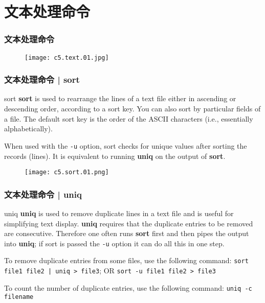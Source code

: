 \section{文本处理命令}
\begin{frame}
  \frametitle{\alert{文本处理命令}}
  \begin{figure}
    \centering
    \texttt{[image: c5.text.01.jpg]}
  \end{figure}
\end{frame}

\begin{frame}[fragile]
  \frametitle{文本处理命令 | sort}
  \begin{block}{sort}
    \textbf{sort} is used to rearrange the lines of a text file either in ascending or descending order, according to a sort key. You can also sort by particular fields of a file. The default sort key is the order of the ASCII characters (i.e., essentially alphabetically).

    When used with the \verb|-u| option, sort checks for unique values after sorting the records (lines). It is equivalent to running \textbf{uniq} on the output of \textbf{sort}.
  \end{block}
  \pause
  \begin{figure}
    \centering
    \texttt{[image: c5.sort.01.png]}
  \end{figure}
\end{frame}

\begin{frame}[fragile]
  \frametitle{文本处理命令 | uniq}
  \begin{block}{uniq}
    \textbf{uniq} is used to remove duplicate lines in a text file and is useful for simplifying text display. \textbf{uniq} requires that the duplicate entries to be removed are consecutive. Therefore one often runs \textbf{sort} first and then pipes the output into \textbf{uniq}; if sort is passed the \verb|-u| option it can do all this in one step. 

    To remove duplicate entries from some files, use the following command: \verb=sort file1 file2 | uniq > file3=; OR \verb|sort -u file1 file2 > file3|

    To count the number of duplicate entries, use the following command: \verb|uniq -c filename|
  \end{block}
\end{frame}

